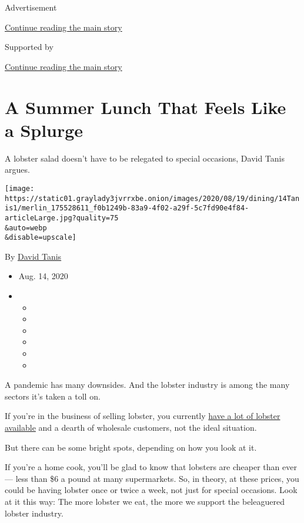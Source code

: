 Advertisement

\protect\hyperlink{after-top}{Continue reading the main story}

Supported by

\protect\hyperlink{after-sponsor}{Continue reading the main story}

\hypertarget{a-summer-lunch-that-feels-like-a-splurge}{%
\section{A Summer Lunch That Feels Like a
Splurge}\label{a-summer-lunch-that-feels-like-a-splurge}}

A lobster salad doesn't have to be relegated to special occasions, David
Tanis argues.

\texttt{[image: https://static01.graylady3jvrrxbe.onion/images/2020/08/19/dining/14Tanis1/merlin\_175528611\_f0b1249b-83a9-4f02-a29f-5c7fd90e4f84-articleLarge.jpg?quality=75\\\&auto=webp\\\&disable=upscale]}

By \href{https://www.nytimes3xbfgragh.onion/by/david-tanis}{David Tanis}

\begin{itemize}
\item
  Aug. 14, 2020
\item
  \begin{itemize}
  \item
  \item
  \item
  \item
  \item
  \item
  \end{itemize}
\end{itemize}

A pandemic has many downsides. And the lobster industry is among the
many sectors it's taken a toll on.

If you're in the business of selling lobster, you currently
\href{https://www.nytimes3xbfgragh.onion/2020/07/03/us/maine-lobster-summer-virus.html}{have
a lot of lobster available} and a dearth of wholesale customers, not the
ideal situation.

But there can be some bright spots, depending on how you look at it.

If you're a home cook, you'll be glad to know that lobsters are cheaper
than ever --- less than \$6 a pound at many supermarkets. So, in theory,
at these prices, you could be having lobster once or twice a week, not
just for special occasions. Look at it this way: The more lobster we
eat, the more we support the beleaguered lobster industry.


